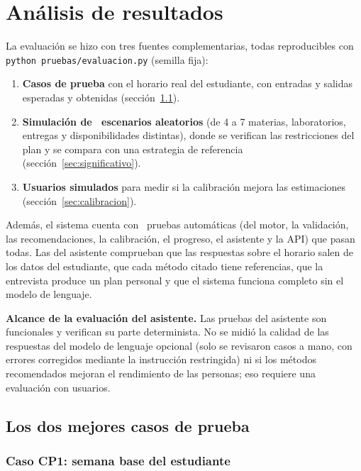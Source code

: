\section{Análisis de resultados}\label{sec:resultados}

La evaluación se hizo con tres fuentes complementarias, todas reproducibles con \texttt{python pruebas/evaluacion.py} (semilla fija):

\begin{enumerate}
    \item \textbf{Casos de prueba} con el horario real del estudiante, con entradas y salidas esperadas y obtenidas (sección~\ref{sec:mejores}).
    \item \textbf{Simulación de \resEscenarios\ escenarios aleatorios} (de 4 a 7 materias, laboratorios, entregas y disponibilidades distintas), donde se verifican las restricciones del plan y se compara con una estrategia de referencia (sección~\ref{sec:significativo}).
    \item \textbf{Usuarios simulados} para medir si la calibración mejora las estimaciones (sección~\ref{sec:calibracion}).
\end{enumerate}

Además, el sistema cuenta con \resPruebas\ pruebas automáticas (del motor, la validación, las recomendaciones, la calibración, el progreso, el asistente y la API) que pasan todas. Las del asistente comprueban que las respuestas sobre el horario salen de los datos del estudiante, que cada método citado tiene referencias, que la entrevista produce un plan personal y que el sistema funciona completo sin el modelo de lenguaje.

\textbf{Alcance de la evaluación del asistente.} Las pruebas del asistente son funcionales y verifican su parte determinista. No se midió la calidad de las respuestas del modelo de lenguaje opcional (solo se revisaron casos a mano, con errores corregidos mediante la instrucción restringida) ni si los métodos recomendados mejoran el rendimiento de las personas; eso requiere una evaluación con usuarios.

\subsection{Los dos mejores casos de prueba}\label{sec:mejores}

\subsubsection{Caso CP1: semana base del estudiante}

